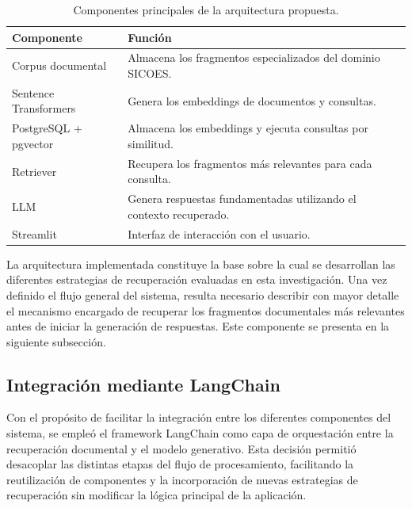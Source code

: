 \begin{table}[H]
\centering
\caption{Componentes principales de la arquitectura propuesta.}
\label{tab:architecture}

\begin{tabular}{p{4cm}p{9cm}}
\hline
\textbf{Componente} & \textbf{Función}\\
\hline

Corpus documental &
Almacena los fragmentos especializados del dominio SICOES.\\

Sentence Transformers &
Genera los embeddings de documentos y consultas.\\

PostgreSQL + pgvector &
Almacena los embeddings y ejecuta consultas por similitud.\\

Retriever &
Recupera los fragmentos más relevantes para cada consulta.\\

LLM &
Genera respuestas fundamentadas utilizando el contexto recuperado.\\

Streamlit &
Interfaz de interacción con el usuario.\\

\hline
\end{tabular}

\end{table}

La arquitectura implementada constituye la base sobre la cual se desarrollan las diferentes estrategias de recuperación evaluadas en esta investigación. Una vez definido el flujo general del sistema, resulta necesario describir con mayor detalle el mecanismo encargado de recuperar los fragmentos documentales más relevantes antes de iniciar la generación de respuestas. Este componente se presenta en la siguiente subsección.


\subsection{Integración mediante LangChain}

Con el propósito de facilitar la integración entre los diferentes componentes del sistema, se empleó el framework LangChain como capa de orquestación entre la recuperación documental y el modelo generativo. Esta decisión permitió desacoplar las distintas etapas del flujo de procesamiento, facilitando la reutilización de componentes y la incorporación de nuevas estrategias de recuperación sin modificar la lógica principal de la aplicación.

